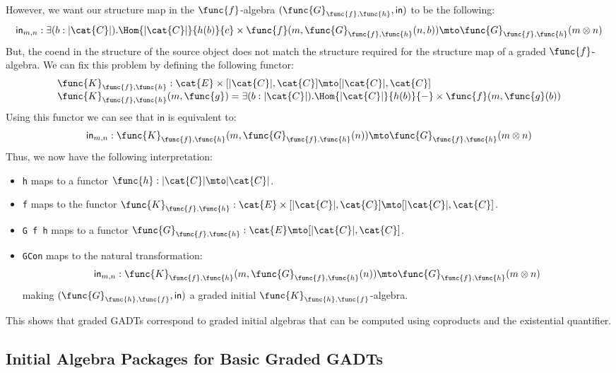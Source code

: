 However, we want our structure map in the $\func{f}$-algebra
$(\func{G}_{\func{f},\func{h}},\mathsf{in})$ to be the following:
\[
    \mathsf{in}_{m,n} : 
    \exists(b : |\cat{C}|).\Hom{|\cat{C}|}{h(b)}{c} \times \func{f}(m,\func{G}_{\func{f},\func{h}}(n,b))
    \mto 
    \func{G}_{\func{f},\func{h}}(m \otimes n)
\]
But, the coend in the structure of the source object does not match
the structure required for the structure map of a graded
$\func{f}$-algebra.  We can fix this problem by defining the following
functor:
\[
    \begin{array}{lll}
        \func{K}_{\func{f},\func{h}} : \cat{E} \times [|\cat{C}|,\cat{C}] \mto [|\cat{C}|,\cat{C}]\\
        \func{K}_{\func{f},\func{h}}(m,\func{g}) = \exists(b : |\cat{C}|).\Hom{|\cat{C}|}{h(b)}{-} \times \func{f}(m,\func{g}(b))
    \end{array}
\]
Using this functor we can see that $\mathsf{in}$ is equivalent to:
\[
    \mathsf{in}_{m,n} : \func{K}_{\func{f},\func{h}}(m,\func{G}_{\func{f},\func{h}}(n)) \mto \func{G}_{\func{f},\func{h}}(m \otimes n)
\]
Thus, we now have the following interpretation:
\begin{itemize}
    \item \verb!h! maps to a functor 
    $\func{h} : |\cat{C}| \mto |\cat{C}|$. 

    \item \verb!f! maps to the functor 
    $\func{K}_{\func{f},\func{h}} : \cat{E} \times [|\cat{C}|,\cat{C}] \mto [|\cat{C}|, \cat{C}]$.    

    \item \verb!G f h! maps to a functor 
          $\func{G}_{\func{f},\func{h}} : \cat{E} \mto [|\cat{C}|,\cat{C}]$.

    \item \verb!GCon! maps to the natural transformation:
          \[
            \mathsf{in}_{m,n} : \func{K}_{\func{f},\func{h}}(m,\func{G}_{\func{f},\func{h}}(n)) \mto \func{G}_{\func{f},\func{h}}(m \otimes n)
          \]
          making $(\func{G}_{\func{h},\func{f}},\mathsf{in})$ a graded
          initial $\func{K}_{\func{h},\func{f}}$-algebra.
\end{itemize}
This shows that graded GADTs correspond to graded initial algebras
that can be computed using coproducts and the existential quantifier.

\subsection{Initial Algebra Packages for Basic Graded GADTs}
\label{subsec:initial_algebra_packages_for_basic_ggadts}

